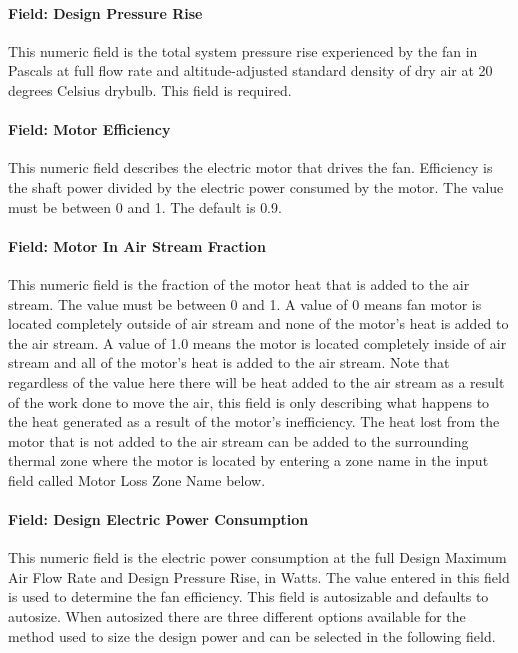 \paragraph{Field: Design Pressure Rise}\label{field-pressure-fansysmodel}

This numeric field is the total system pressure rise experienced by the fan in Pascals at full flow rate and altitude-adjusted standard density of dry air at 20 degrees Celsius drybulb. This field is required.

\paragraph{Field: Motor Efficiency}\label{field-motor-eff-fansysmodel}

This numeric field describes the electric motor that drives the fan.  Efficiency is the shaft power divided by the electric power consumed by the motor.  The value must be between 0 and 1. The default is 0.9.

\paragraph{Field: Motor In Air Stream Fraction}\label{field-motor-in-air-stream-fansysmodel}

This numeric field is the fraction of the motor heat that is added to the air stream.  The value must be between 0 and 1.  A value of 0 means fan motor is located completely outside of air stream and none of the motor's heat is added to the air stream.  A value of 1.0 means the motor is located completely inside of air stream and all of the motor's heat is added to the air stream.  Note that regardless of the value here there will be heat added to the air stream as a result of the work done to move the air, this field is only describing what happens to the heat generated as a result of the motor's inefficiency. The heat lost from the motor that is not added to the air stream can be added to the surrounding thermal zone where the motor is located by entering a zone name in the input field called Motor Loss Zone Name below.

\paragraph{Field: Design Electric Power Consumption}\label{field-design-elec-power-fansysmodel}

This numeric field is the electric power consumption at the full Design Maximum Air Flow Rate and Design Pressure Rise, in Watts.  The value entered in this field is used to determine the fan efficiency. This field is autosizable and defaults to autosize.  When autosized there are three different options available for the method used to size the design power and can be selected in the following field.

